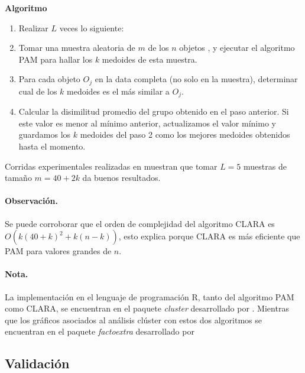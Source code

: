 \documentclass[12pt,oneside]{book}\usepackage[]{graphicx}\usepackage[]{color}
\theoremstyle{definition} %
\begin{document}
\textbf{Algoritmo}

\begin{enumerate}
\item Realizar $L$ veces lo siguiente:
\item Tomar una muestra aleatoria de $m$ de los $n$ objetos , y ejecutar el algoritmo PAM para hallar los $k$ medoides de esta muestra.
\item Para cada objeto $O_j$ en la data completa (no solo en la muestra), determinar cual de los $k$ medoides es el más similar a $O_j$.
\item Calcular la disimilitud promedio del grupo obtenido en el paso anterior. Si este valor es menor al mínimo anterior, actualizamos el valor mínimo y guardamos los $k$ medoides del paso 2 como los mejores medoides obtenidos hasta el momento.

\end{enumerate}

Corridas experimentales realizadas en \citeauthor{rousseeuw1990finding} \citeyear{rousseeuw1990finding} muestran que tomar $L=5$ muestras de tamaño $m=40 + 2k$ da buenos resultados. 

\paragraph{Observación. } Se puede corroborar que el orden de complejidad del algoritmo CLARA es $O(k(40+k)^2+k(n-k))$, esto explica porque CLARA es más eficiente que PAM para valores grandes de $n$.

\paragraph{Nota.}

La implementación en el lenguaje de programación R, tanto del algoritmo PAM como CLARA, se encuentran en el paquete \textit{cluster} desarrollado por \citeauthor{clust2019r} \citeyear{clust2019r}. Mientras que los gráficos asociados al análisis clúster con estos dos algoritmos se encuentran en el paquete \textit{factoextra} desarrollado por \citeauthor{factoext2017r} \citeyear{factoext2017r}


\subsection{Validación}
\end{document}
